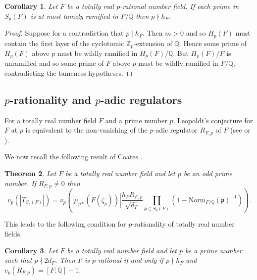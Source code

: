 \documentclass[12pt, a4paper, usenames]{amsart}
\newcommand{\Z}{\mathbb{Z}}
\newcommand{\Q}{\mathbb{Q}}
\theoremstyle{plain}
\newtheorem{theorem}{Theorem}[section]
\newtheorem{corollary}[theorem]{Corollary}
\theoremstyle{remark}
\theoremstyle{definition}
\newcommand{\Norm}{\mathrm{Norm}}
\begin{document}
\begin{corollary}\label{cor:tot-real-p-rat-tame}
Let $F$ be a totally real $p$-rational number field. 
If each prime in $S_{p}(F)$ is at most tamely ramified in $F/\Q$ then 
$p \nmid h_{F}$.
\end{corollary}

\begin{proof}
Suppose for a contradiction that $p \mid h_{F}$.
Then $m > 0$ and so $H_{p}(F)$ must contain the first layer of the cyclotomic $\Z_{p}$-extension of $\Q$.
Hence some prime of $H_{p}(F)$ above $p$ must be wildly ramified in $H_{p}(F)/\Q$.
But $H_{p}(F)/F$ is unramified and so some prime of $F$ above $p$ must be wildly 
ramified in $F/\Q$, contradicting the tameness hypotheses.
\end{proof}

\subsection{$p$-rationality and $p$-adic regulators}
For a totally real number field $F$ and a prime number $p$, Leopoldt's conjecture
for $F$ at $p$ is equivalent to the non-vanishing of 
the $p$-adic regulator $R_{F,p}$ of $F$ (see \cite[\S 5.5]{MR1421575} or \cite[(10.3.5)]{MR2392026}).

We now recall the following result of Coates \cite[Appendix, Lemma~8]{MR460282}.

\begin{theorem}\label{thm:Coates}
Let $F$ be a totally real number field and let $p$ be an odd prime number. 
If $R_{F,p} \neq 0$ then 
\[
v_{p}\left( | T_{S_{p}(F)} | \right) 
= v_{p}\left( 
|\mu_{p^{\infty}}(F(\zeta_{p}))| \frac{h_{F}R_{F,p}}{\sqrt{d_{F}}} 
\prod_{\mathfrak{p} \in S_{p}(F)} \left( 1 - \Norm_{F/\Q}(\mathfrak{p})^{-1} \right)
\right). 
\]
\end{theorem}

This leads to the following condition for $p$-rationality of totally real number fields.

\begin{corollary}\label{cor:p-rat-p-reg}
Let $F$ be a totally real number field and let $p$ be a prime number such that $p \nmid 2d_{F}$.
Then $F$ is $p$-rational if and only if $p \nmid h_{F}$ and $v_{p}(R_{F,p})=[F:\Q]-1$.
\end{corollary}
\end{document}
